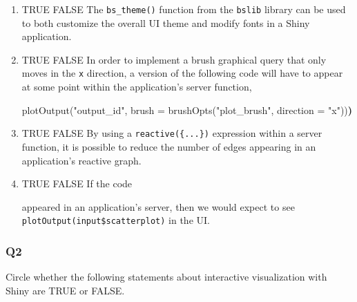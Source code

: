 \documentclass[
]{article}
\newenvironment{Shaded}{\begin{snugshade}}{\end{snugshade}}
\newcommand{\AttributeTok}[1]{\textcolor[rgb]{0.77,0.63,0.00}{#1}}
\newcommand{\ErrorTok}[1]{\textcolor[rgb]{0.64,0.00,0.00}{\textbf{#1}}}
\newcommand{\FunctionTok}[1]{\textcolor[rgb]{0.00,0.00,0.00}{#1}}
\newcommand{\NormalTok}[1]{#1}
\newcommand{\OtherTok}[1]{\textcolor[rgb]{0.56,0.35,0.01}{#1}}
\newcommand{\SpecialCharTok}[1]{\textcolor[rgb]{0.00,0.00,0.00}{#1}}
\newcommand{\StringTok}[1]{\textcolor[rgb]{0.31,0.60,0.02}{#1}}
\begin{document}
\begin{enumerate}
\def\labelenumi{\alph{enumi}.}
\item
  TRUE FALSE The \texttt{bs\_theme()} function from the \texttt{bslib}
  library can be used to both customize the overall UI theme and modify
  fonts in a Shiny application.
\item
  TRUE FALSE In order to implement a brush graphical query that only
  moves in the \texttt{x} direction, a version of the following code
  will have to appear at some point within the application's server
  function,

\begin{Shaded}
\begin{Highlighting}[]
\FunctionTok{plotOutput}\NormalTok{(}\StringTok{"output\_id"}\NormalTok{, }\AttributeTok{brush =} \FunctionTok{brushOpts}\NormalTok{(}\StringTok{"plot\_brush"}\NormalTok{, }\AttributeTok{direction =} \StringTok{"x"}\NormalTok{))}\ErrorTok{)}
\end{Highlighting}
\end{Shaded}
\item
  TRUE FALSE By using a \texttt{reactive(\{...\})} expression within a
  server function, it is possible to reduce the number of edges
  appearing in an application's reactive graph.
\item
  TRUE FALSE If the code

\begin{Shaded}
\end{Shaded}

  appeared in an application's server, then we would expect to see
  \texttt{plotOutput(input\$scatterplot)} in the UI.
\end{enumerate}

\hypertarget{q2}{%
\subsubsection{Q2}\label{q2}}

Circle whether the following statements about interactive visualization
with Shiny are TRUE or FALSE.
\end{document}
